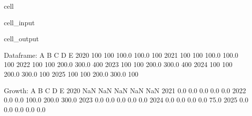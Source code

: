 \documentclass[letterpaper,10pt,english]{jupyterBook}
\begin{document}
\begin{sphinxuseclass}{cell}\begin{sphinxVerbatimInput}

\begin{sphinxuseclass}{cell_input}
\begin{sphinxVerbatim}[commandchars=\\\{\}]
  
  
\end{sphinxVerbatim}

\end{sphinxuseclass}\end{sphinxVerbatimInput}
\begin{sphinxVerbatimOutput}

\begin{sphinxuseclass}{cell_output}
\begin{sphinxVerbatim}[commandchars=\\\{\}]
Dataframe:
        A    B      C      D    E
2020  100  100  100.0  100.0  100
2021  100  100  100.0  100.0  100
2022  100  100  200.0  300.0  400
2023  100  100  200.0  300.0  400
2024  100  100  200.0  300.0  100
2025  100  100  200.0  300.0  100

Growth:
        A    B      C      D      E
2020  NaN  NaN    NaN    NaN    NaN
2021  0.0  0.0    0.0    0.0    0.0
2022  0.0  0.0  100.0  200.0  300.0
2023  0.0  0.0    0.0    0.0    0.0
2024  0.0  0.0    0.0    0.0  \PYGZhy{}75.0
2025  0.0  0.0    0.0    0.0    0.0
\end{sphinxVerbatim}

\end{sphinxuseclass}\end{sphinxVerbatimOutput}

\end{sphinxuseclass}
\end{document}
